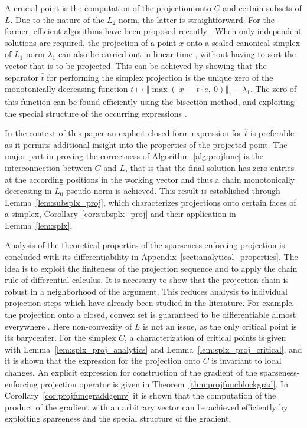 \documentclass[twoside,11pt]{article}
\newcommand{\0}{\mathcal{O}}
\newcommand{\norm}[1]{\left\Vert#1\right\Vert}
\newcommand{\abs}[1]{\left\vert #1 \right\vert}
\begin{document}
A crucial point is the computation of the projection onto $C$ and certain subsets of $L$.
Due to the nature of the $L_2$ norm, the latter is straightforward.
For the former, efficient algorithms have been proposed recently \citep{Duchi2008,Chen2011}.
When only independent solutions are required, the projection of a point $x$ onto a scaled canonical simplex of $L_1$ norm $\lambda_1$ can also be carried out in linear time \citep{Liu2009a}, without having to sort the vector that is to be projected.
This can be achieved by showing that the separator $\hat{t}$ for performing the simplex projection is the unique zero of the monotonically decreasing function $t \mapsto \norm{\max\left(\abs{x} - t\cdot e,\ 0\right)}_1 - \lambda_1$.
The zero of this function can be found efficiently using the bisection method, and exploiting the special structure of the occurring expressions \citep{Liu2009a}.

In the context of this paper an explicit closed-form expression for $\hat{t}$ is preferable as it permits additional insight into the properties of the projected point.
The major part in proving the correctness of Algorithm~\ref{alg:projfunc} is the interconnection between $C$ and $L$, that is that the final solution has zero entries at the according positions in the working vector and thus a chain monotonically decreasing in $L_0$ pseudo-norm is achieved.
This result is established through Lemma~\ref{lem:subsplx_proj}, which characterizes projections onto certain faces of a simplex, Corollary~\ref{cor:subsplx_proj} and their application in Lemma~\ref{lem:splx}.

Analysis of the theoretical properties of the sparseness-enforcing projection is concluded with its differentiability in Appendix~\ref{sect:analytical_properties}.
The idea is to exploit the finiteness of the projection sequence and to apply the chain rule of differential calculus.
It is necessary to show that the projection chain is robust in a neighborhood of the argument.
This reduces analysis to individual projection steps which have already been studied in the literature.
For example, the projection onto a closed, convex set is guaranteed to be differentiable almost everywhere \citep{Hiriart-Urruty1982}.
Here non-convexity of $L$ is not an issue, as the only critical point is its barycenter.
For the simplex $C$, a characterization of critical points is given with Lemma~\ref{lem:splx_proj_analytics} and Lemma~\ref{lem:splx_proj_critical}, and it is shown that the expression for the projection onto $C$ is invariant to local changes.
An explicit expression for construction of the gradient of the sparseness-enforcing projection operator is given in Theorem~\ref{thm:projfuncblockgrad}.
In Corollary~\ref{cor:projfuncgraddgemv} it is shown that the computation of the product of the gradient with an arbitrary vector can be achieved efficiently by exploiting sparseness and the special structure of the gradient.
\end{document}
